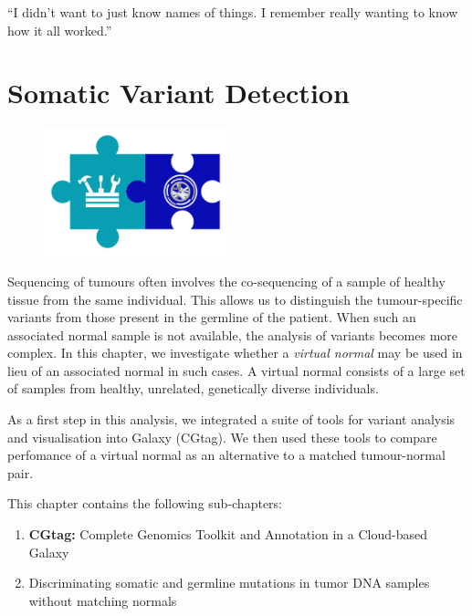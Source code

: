 \begin{savequote}[75mm]
“I didn’t want to just know names of things. I remember really wanting to know how it all worked.”
\end{savequote}

\chapter{Somatic Variant Detection}\label{chapter:virtualnormal}
\setcounter{figure}{-1}
\setcounter{table}{-1}
\setcounter{section}{-1}

\begin{figure}[t!]
\includegraphics[height=10em]{frontmatter/images/chapter-header-variants-tools.png}
\end{figure}
\setcounter{figure}{-1}
\setcounter{table}{-1}
\setcounter{section}{-1}


Sequencing of tumours often involves the co-sequencing of a sample of healthy tissue from the same individual. This allows us to distinguish the tumour-specific variants from those present in the germline of the patient. When such an associated normal sample is not available, the analysis of variants becomes more complex. In this chapter, we investigate whether a \emph{virtual normal} may be used in lieu of an associated normal in such cases. A virtual normal consists of a large set of samples from healthy, unrelated, genetically diverse individuals.

As a first step in this analysis, we integrated a suite of tools for variant analysis and visualisation into Galaxy (CGtag). We then used these tools to compare perfomance of a virtual normal as an alternative to a matched tumour-normal pair.

This chapter contains the following sub-chapters:

\begin{enumerate}[label=\ref{chapter:virtualnormal}.\arabic*]
\itemsep-0.5em
\setcounter{enumi}{-1}
\item \textbf{CGtag:} Complete Genomics Toolkit and Annotation in a Cloud-based Galaxy
\item Discriminating somatic and germline mutations in tumor DNA samples without matching normals
\end{enumerate}
